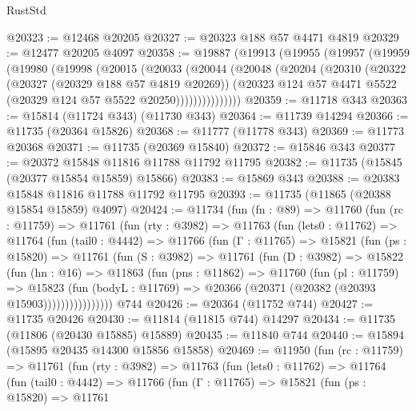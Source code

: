 \begin{lexlean}{RustStd}
\begin{coremodule}
@20323 := @12468 @20205
@20327 := @20323 @188 @57 @4471 @4819
@20329 := @12477 @20205 @4097
@20358 := @19887
    (@19913
      (@19955
        (@19957
          (@19959
            (@19980
              (@19998
                (@20015
                  (@20033
                    (@20044
                      (@20048
                        (@20204
                          (@20310
                            (@20322
                              (@20327 (@20329 @188 @57 @4819 @20269))
                              (@20323
                                @124
                                @57
                                @4471
                                @5522
                                (@20329 @124 @57 @5522 @20250)))))))))))))))
@20359 := @11718 @343
@20363 := @15814 (@11724 @343) (@11730 @343)
@20364 := @11739 @14294
@20366 := @11735 (@20364 @15826)
@20368 := @11777 (@11778 @343)
@20369 := @11773 @20368
@20371 := @11735 (@20369 @15840)
@20372 := @15846 @343
@20377 := @20372 @15848 @11816 @11788 @11792 @11795
@20382 := @11735 (@15845 (@20377 @15854 @15859) @15866)
@20383 := @15869 @343
@20388 := @20383 @15848 @11816 @11788 @11792 @11795
@20393 := @11735 (@11865 (@20388 @15854 @15859) @4097)
@20424 := @11734
    (fun (fn : @89) =>
    @11760
      (fun (rc : @11759) =>
      @11761
        (fun (rty : @3982) =>
        @11763
          (fun (lets0 : @11762) =>
          @11764
            (fun (tail0 : @4442) =>
            @11766
              (fun (Γ : @11765) =>
              @15821
                (fun (ps : @15820) =>
                @11761
                  (fun (S : @3982) =>
                  @11761
                    (fun (D : @3982) =>
                    @15822
                      (fun (hn : @16) =>
                      @11863
                        (fun (pns : @11862) =>
                        @11760
                          (fun (pl : @11759) =>
                          @15823
                            (fun (bodyL : @11769) =>
                            @20366 (@20371 (@20382 (@20393 @15903))))))))))))))))
    @744
@20426 := @20364 (@11752 @744)
@20427 := @11735 @20426
@20430 := @11814 (@11815 @744) @14297
@20434 := @11735 (@11806 (@20430 @15885) @15889)
@20435 := @11840 @744
@20440 := @15894 (@15895 @20435 @14300 @15856 @15858)
@20469 := @11950
    (fun (rc : @11759) =>
    @11761
      (fun (rty : @3982) =>
      @11763
        (fun (lets0 : @11762) =>
        @11764
          (fun (tail0 : @4442) =>
          @11766
            (fun (Γ : @11765) =>
            @15821
              (fun (ps : @15820) =>
              @11761

\end{coremodule}
\end{lexlean}
